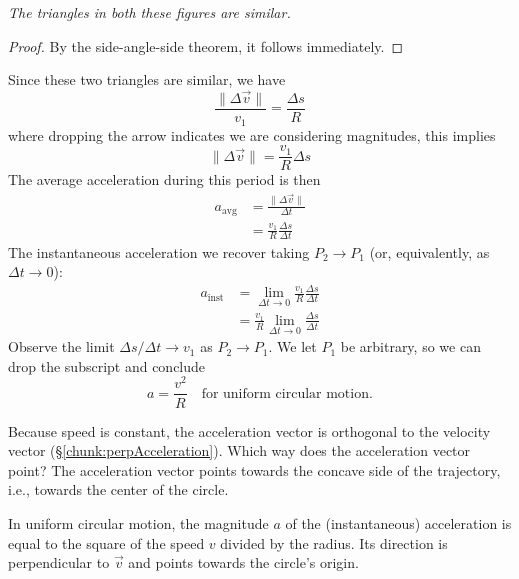  \textit{The triangles in both these figures are similar.}

\begin{proof}
By the side-angle-side theorem, it follows immediately.
\end{proof}

Since these two triangles are similar, we have
\begin{equation}
\frac{\|\Delta\vec{v}\|}{v_{1}}=\frac{\Delta s}{R}
\end{equation}
where dropping the arrow indicates we are considering magnitudes, this
implies
\begin{equation}
\|\Delta\vec{v}\| = \frac{v_{1}}{R}\Delta s
\end{equation}
The average acceleration during this period is then
\begin{equation}
\begin{split}
a_{\text{avg}}&=\frac{\|\Delta\vec{v}\|}{\Delta t}\\
&=\frac{v_{1}}{R}\frac{\Delta s}{\Delta t}
\end{split}
\end{equation}
The instantaneous acceleration we recover taking $P_{2}\to P_{1}$ (or,
equivalently, as $\Delta t\to0$):
\begin{equation}
\begin{split}
a_{\text{inst}} &= \lim_{\Delta t\to0}\frac{v_{1}}{R}\frac{\Delta s}{\Delta t}\\
&=\frac{v_{1}}{R}\lim_{\Delta t\to0}\frac{\Delta s}{\Delta t}
\end{split}
\end{equation}
Observe the limit $\Delta s/\Delta t\to v_{1}$ as $P_{2}\to P_{1}$. We
let $P_{1}$ be arbitrary, so we can drop the subscript and conclude
\begin{equation}
a = \frac{v^{2}}{R}\quad\mbox{for uniform circular motion}.
\end{equation}

Because speed is constant, the acceleration vector is orthogonal to the
velocity vector (\S\ref{chunk:perpAcceleration}). Which way does
the acceleration vector point? The acceleration vector points towards
the concave side of the trajectory, i.e., towards the center of the
circle.

In uniform circular motion, the magnitude $a$ of the (instantaneous)
acceleration is equal to the square of the speed $v$ divided by the
radius. Its direction is perpendicular to $\vec{v}$ and points towards
the circle's origin.

